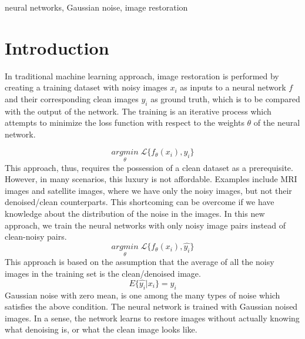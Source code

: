\documentclass[journal]{IEEEtran} %
\begin{document}
\begin{IEEEkeywords}
    neural networks, Gaussian noise, image restoration
\end{IEEEkeywords}

\section{Introduction}
In traditional machine learning approach, image restoration is performed by creating a training dataset with noisy images $x_i$ as inputs to a neural network $f$ and their corresponding clean images $y_i$ as ground truth, which is to be compared with the output of the network. The training is an iterative process which attempts to minimize the loss function with respect to the weights $\theta$ of the neural network.


\begin{equation}
    \underset{\theta}{argmin}\;\mathcal{L}\{f_\theta(x_i), y_i\}
\end{equation}
This approach, thus, requires the possession of a clean dataset as a prerequisite. However, in many scenarios, this luxury is not affordable. Examples include MRI images and satellite images, where we have only the noisy images, but not their denoised/clean counterparts. This shortcoming can be overcome if we have knowledge about the distribution of the noise in the images. In this new approach, we train the neural networks with only noisy image pairs instead of clean-noisy pairs.
\begin{equation}
    \underset{\theta}{argmin}\;\mathcal{L}\{f_\theta(x_i), \hat{y_i}\}
\end{equation}
This approach is based on the assumption that the average of all the noisy images in the training set is the clean/denoised image.
\begin{equation}
    E\{\hat{y_i}|x_i\} = y_i
\end{equation}
Gaussian noise with zero mean, is one among the many types of noise which satisfies the above condition. The neural network is trained with Gaussian noised images. In a sense, the network learns to restore images without actually knowing what denoising is, or what the clean image looks like.
\end{document}
